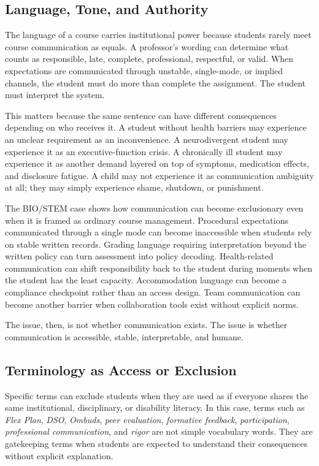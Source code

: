 \documentclass[12pt]{article}
\begin{document}
\subsection*{Language, Tone, and Authority}

The language of a course carries institutional power because students rarely meet course communication as equals. A professor's wording can determine what counts as responsible, late, complete, professional, respectful, or valid. When expectations are communicated through unstable, single-mode, or implied channels, the student must do more than complete the assignment. The student must interpret the system.

This matters because the same sentence can have different consequences depending on who receives it. A student without health barriers may experience an unclear requirement as an inconvenience. A neurodivergent student may experience it as an executive-function crisis. A chronically ill student may experience it as another demand layered on top of symptoms, medication effects, and disclosure fatigue. A child may not experience it as communication ambiguity at all; they may simply experience shame, shutdown, or punishment.

The BIO/STEM case shows how communication can become exclusionary even when it is framed as ordinary course management. Procedural expectations communicated through a single mode can become inaccessible when students rely on stable written records. Grading language requiring interpretation beyond the written policy can turn assessment into policy decoding. Health-related communication can shift responsibility back to the student during moments when the student has the least capacity. Accommodation language can become a compliance checkpoint rather than an access design. Team communication can become another barrier when collaboration tools exist without explicit norms.

The issue, then, is not whether communication exists. The issue is whether communication is accessible, stable, interpretable, and humane.

\subsection*{Terminology as Access or Exclusion}

Specific terms can exclude students when they are used as if everyone shares the same institutional, disciplinary, or disability literacy. In this case, terms such as \textit{Flex Plan}, \textit{DSO}, \textit{Ombuds}, \textit{peer evaluation}, \textit{formative feedback}, \textit{participation}, \textit{professional communication}, and \textit{rigor} are not simple vocabulary words. They are gatekeeping terms when students are expected to understand their consequences without explicit explanation.
\end{document}
